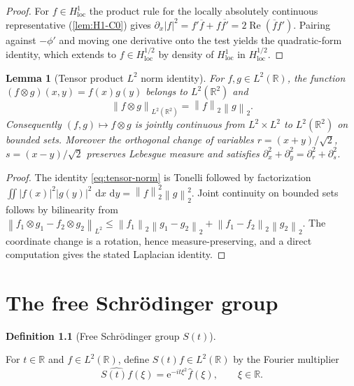 \documentclass[11pt,oneside]{book}
\providecommand{\uses}[1]{}
\newtheorem{lemma}[theorem]{Lemma}
\theoremstyle{definition}
\newtheorem{definition}[theorem]{Definition}
\theoremstyle{remark}
\newcommand{\R}{\mathbb R}
\newcommand{\1}{\mathbf 1}
\newcommand{\loc}{\mathrm{loc}}
\newcommand{\Rea}{\operatorname{Re}}
\newcommand{\dd}{\,\mathrm d}
\newcommand{\norm}[1]{\left\lVert #1\right\rVert}
\newcommand{\abs}[1]{\left\lvert #1\right\rvert}
\newcommand{\e}{\mathrm e}
\begin{document}
\begin{proof}
\uses{lem:H1-C0}
For $f\in H^1_\loc$ the product rule for the locally absolutely continuous representative
(\cref{lem:H1-C0}) gives $\partial_x\abs f^2=f'\overline f+f\overline{f'}=2\Rea(\overline f f')$.
Pairing against $-\phi'$ and moving one derivative onto the test yields the quadratic-form
identity, which extends to $f\in H^{1/2}_\loc$ by density of $H^1_\loc$ in $H^{1/2}_\loc$.
\end{proof}

\begin{lemma}[Tensor product $L^2$ norm identity]\label{lem:tensor-norm}
For $f,g\in L^2(\R)$, the function $(f\otimes g)(x,y)=f(x)g(y)$ belongs to
$L^2(\R^2)$ and
\begin{equation}
 \norm{f\otimes g}_{L^2(\R^2)}=\norm{f}_2\norm{g}_2.
 \label{eq:tensor-norm}
\end{equation}
Consequently $(f,g)\mapsto f\otimes g$ is jointly continuous from
$L^2\times L^2$ to $L^2(\R^2)$ on bounded sets. Moreover the orthogonal change
of variables $r=(x+y)/\sqrt2$, $s=(x-y)/\sqrt2$ preserves Lebesgue measure and
satisfies $\partial_x^2+\partial_y^2=\partial_r^2+\partial_s^2$.
\end{lemma}

\begin{proof}
The identity \eqref{eq:tensor-norm} is Tonelli followed by factorization
$\iint\abs{f(x)}^2\abs{g(y)}^2\,\dd x\,\dd y=\norm{f}_2^2\norm{g}_2^2$. Joint
continuity on bounded sets follows by bilinearity from
$\norm{f_1\otimes g_1-f_2\otimes g_2}_{L^2}\le\norm{f_1}_2\norm{g_1-g_2}_2+\norm{f_1-f_2}_2\norm{g_2}_2$.
The coordinate change is a rotation, hence measure-preserving, and a direct
computation gives the stated Laplacian identity.
\end{proof}


\chapter{The free Schr\"odinger group}\label{chap:free-group}

\begin{definition}[Free Schr\"odinger group $S(t)$]
\label{def:propagator}
\uses{def:fourier-convention}
For $t\in\R$ and $f\in L^2(\R)$, define $S(t)f\in L^2(\R)$ by the Fourier
multiplier
\begin{equation}
 \widehat{S(t)f}(\xi)=\e^{-it\xi^2}\widehat f(\xi),
 \qquad\xi\in\R.
 \label{eq:free-group}
\end{equation}
\end{definition}
\end{document}
